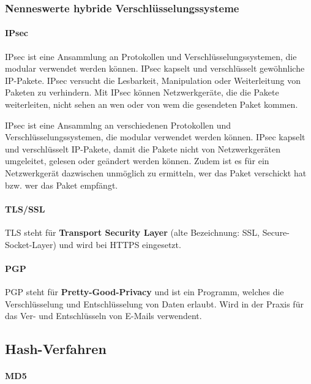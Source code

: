 \documentclass[12pt,a4paper]{report}
\begin{document}
\begin{onehalfspace}
\subsubsection{Nenneswerte hybride Verschlüsselungssysteme}

\paragraph{IPsec}

IPsec ist eine Ansammlung an Protokollen und Verschlüsselungssystemen, die modular verwendet werden können. IPsec kapselt und verschlüsselt gewöhnliche IP-Pakete. IPsec versucht die Lesbarkeit, Manipulation oder Weiterleitung von Paketen zu verhindern. Mit IPsec können Netzwerkgeräte, die die Pakete weiterleiten, nicht sehen an wen oder von wem die gesendeten Paket kommen.

IPsec ist eine Ansammlng an verschiedenen Protokollen und Verschlüsselungssystemen, die modular verwendet werden können. IPsec kapselt und verschlüsselt IP-Pakete, damit die Pakete nicht von Netzwerkgeräten umgeleitet, gelesen oder geändert werden können. Zudem ist es für ein Netzwerkgerät dazwischen unmöglich zu ermitteln, wer das Paket verschickt hat bzw. wer das Paket empfängt.

\paragraph{TLS/SSL}

TLS steht für \textbf{Transport Security Layer} (alte Bezeichnung: SSL, Secure-Socket-Layer) und wird bei HTTPS eingesetzt.

\paragraph{PGP}

PGP steht für \textbf{Pretty-Good-Privacy} und ist ein Programm, welches die Verschlüsselung und Entschlüsselung von Daten erlaubt. Wird in der Praxis für das Ver- und Entschlüsseln von E-Mails verwendent.

\subsection{Hash-Verfahren}

\paragraph{MD5}


\end{onehalfspace}
\end{document}
